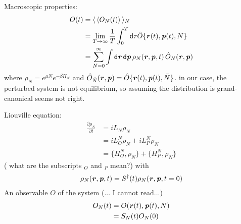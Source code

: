 \documentclass[aps,pre,preprint]{revtex4-1}
\newcommand{\bluec}[1]{{\color{blue} #1}}
\renewcommand{\v}[1]{\textbf{\textit{#1}}}
\renewcommand{\d}[1]{\textsf{#1}}
\begin{document}




Macroscopic properties:
\begin{align}\nonumber
  O(t) &= \langle\,\langle O_N(t) \rangle\,\rangle_N\\\label{eqn:tmp1}
  & = \lim_{T\rightarrow\infty}\frac1T\int_0^T\d d\tau\hat O\{\v r(t), \v p(t), N\}\\\label{eqn:tmp2}
  & = \sum_{N=0}^\infty\int\d d\v r\,\d d\v p\,\rho_N(\v r, \v p, t)\,\hat O_N(\v r, \v p)
\end{align}
where $\rho_N = e^{\mu N}e^{-\beta H_N}$ and $\hat O_{\bar N}(\v r,\v
p) = \hat O\{\v r(t), \v p(t), \bar N\}$. \bluec{in our case, the
  perturbed system is not equilibrium, so assuming the distribution is
  grand-canonical seems not right.}

Liouville equation:
\begin{align}\nonumber
  \frac{\partial\rho_N}{\partial t}
  & = iL_N\rho_N \\\nonumber
  & = iL_O^N\rho_N + iL_P^N\rho_N \\
  & = \{H_O^N, \rho_N\} + \{H_P^N, \rho_N\}
\end{align}
(\bluec{what are the subscripts $_O$ and $_P$ mean?}) with
\begin{align}
  \rho_N(\v r, \v p, t) = S^{\dagger}(t)\rho_N(\v r, \v p, t=0)
\end{align}
An observable $O$ of the system (... \bluec{I cannot read...})
\begin{align}\nonumber
  O_N(t)
  &= O(\v r(t), \v p(t), N) \\
  &= S_N(t) O_N(0)
\end{align}
\end{document}
